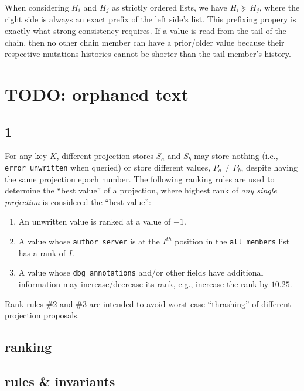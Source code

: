 \documentclass[preprint,10pt]{sigplanconf}
\begin{document}
When considering $H_i$ and $H_j$ as strictly ordered lists, we have 
$H_i \succeq H_j$, where the right side is always an exact prefix of the left
side's list.  This prefixing propery is exactly what strong
consistency requires.  If a value is read from the tail of the chain,
then no other chain member can have a prior/older value because their
respective mutations histories cannot be shorter than the tail
member's history.

\section{TODO: orphaned text}

\subsection{1}

For any key $K$, different projection stores $S_a$ and $S_b$ may store
nothing (i.e., {\tt error\_unwritten} when queried) or store different
values, $P_a \ne P_b$, despite having the same projection epoch
number.  The following ranking rules are used to
determine the ``best value'' of a projection, where highest rank of
{\em any single projection} is considered the ``best value'':

\begin{enumerate}
\item An unwritten value is ranked at a value of $-1$.
\item A value whose {\tt author\_server} is at the $I^{th}$ position
  in the {\tt all\_members} list has a rank of $I$.
\item A value whose {\tt dbg\_annotations} and/or other fields have
  additional information may increase/decrease its rank, e.g.,
  increase the rank by $10.25$.
\end{enumerate}

Rank rules \#2 and \#3 are intended to avoid worst-case ``thrashing''
of different projection proposals.

\subsection{ranking}
\label{sub:projection-ranking}

\subsection{rules \& invariants}
\label{sub:humming-rules-and-invariants}
\end{document}
